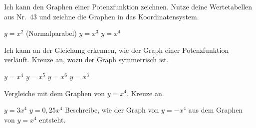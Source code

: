 \begin{aufgabe}{Ich kann den Graphen einer Potenzfunktion zeichnen. Nutze deine Wertetabellen aus Nr.~43 und zeichne die Graphen in das Koordinatensystem.}
\begin{teile}
\teil $y = x^2$ (Normalparabel) \quad \teil $y = x^3$ \quad \teil $y = x^4$
\end{teile}

\begin{ksys}[xmin=-2,xmax=2,ymin=-8,ymax=16,xstep=0.5,ystep=2]
\end{ksys}

\end{aufgabe}

\begin{aufgabe}{Ich kann an der Gleichung erkennen, wie der Graph einer Potenzfunktion verläuft. Kreuze an, wozu der Graph symmetrisch ist.}
\begin{teile}
\teil $y = x^4$ \hfill {}
\teil $y = x^5$ \hfill {}
\teil $y = x^6$ \hfill {}
\teil $y = x^3$ \hfill {}
\end{teile}
Vergleiche mit dem Graphen von $y = x^4$. Kreuze an.
\begin{teile}
\teil $y = 3x^4$ \hfill {}
\teil $y = 0{,}25x^4$ \hfill {}
\teil Beschreibe, wie der Graph von $y = -x^4$ aus dem Graphen von $y = x^4$ entsteht.
\end{teile}
\end{aufgabe}

